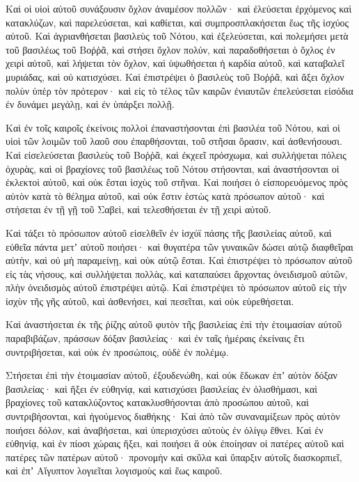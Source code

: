 {\par }{\PP {}Καὶ οἱ υἱοὶ αὐτοῦ συνάξουσιν ὄχλον ἀναμέσον πολλῶν· καὶ ἐλεύσεται ἐρχόμενος καὶ κατακλύζων, καὶ παρελεύσεται, καὶ καθίεται, καὶ συμπροσπλακήσεται ἕως τῆς ἰσχύος αὐτοῦ.
Καὶ ἀγριανθήσεται βασιλεὺς τοῦ Νότου, καὶ ἐξελεύσεται, καὶ πολεμήσει μετὰ τοῦ βασιλέως τοῦ Βοῤῥᾶ, καὶ στήσει ὄχλον πολύν, καὶ παραδοθήσεται ὁ ὄχλος ἐν χειρὶ αὐτοῦ,
καὶ λήψεται τὸν ὄχλον, καὶ ὑψωθήσεται ἡ καρδία αὐτοῦ, καὶ καταβαλεῖ μυριάδας, καὶ οὐ κατισχύσει.
Καὶ ἐπιστρέψει ὁ βασιλεὺς τοῦ Βοῤῥᾶ, καὶ ἄξει ὄχλον πολὺν ὑπὲρ τὸν πρότερον· καὶ εἰς τὸ τέλος τῶν καιρῶν ἐνιαυτῶν ἐπελεύσεται εἰσόδια ἐν δυνάμει μεγάλῃ, καὶ ἐν ὑπάρξει πολλῇ.
\par }{\PP {}Καὶ ἐν τοῖς καιροῖς ἐκείνοις πολλοὶ ἐπαναστήσονται ἐπὶ βασιλέα τοῦ Νότου, καὶ οἱ υἱοὶ τῶν λοιμῶν τοῦ λαοῦ σου ἐπαρθήσονται, τοῦ στῆσαι ὅρασιν, καὶ ἀσθενήσουσι.
Καὶ εἰσελεύσεται βασιλεὺς τοῦ Βοῤῥᾶ, καὶ ἐκχεεῖ πρόσχωμα, καὶ συλλήψεται πόλεις ὀχυρὰς, καὶ οἱ βραχίονες τοῦ βασιλέως τοῦ Νότου στήσονται, καὶ ἀναστήσονται οἱ ἐκλεκτοὶ αὐτοῦ, καὶ οὐκ ἔσται ἰσχὺς τοῦ στῆναι.
Καὶ ποιήσει ὁ εἰσπορευόμενος πρὸς αὐτὸν κατὰ τὸ θέλημα αὐτοῦ, καὶ οὐκ ἔστιν ἑστὼς κατὰ πρόσωπον αὐτοῦ· καὶ στήσεται ἐν τῇ γῇ τοῦ Σαβεὶ, καὶ τελεσθήσεται ἐν τῇ χειρὶ αὐτοῦ.
\par }{\PP {}Καὶ τάξει τὸ πρόσωπον αὐτοῦ εἰσελθεῖν ἐν ἰσχύϊ πάσης τῆς βασιλείας αὐτοῦ, καὶ εὐθεῖα πάντα μετʼ αὐτοῦ ποιήσει· καὶ θυγατέρα τῶν γυναικῶν δώσει αὐτῷ διαφθεῖραι αὐτὴν, καὶ οὐ μὴ παραμείνῃ, καὶ οὐκ αὐτῷ ἔσται.
Καὶ ἐπιστρέψει τὸ πρόσωπον αὐτοῦ εἰς τὰς νήσους, καὶ συλλήψεται πολλὰς, καὶ καταπαύσει ἄρχοντας ὀνειδισμοῦ αὐτῶν, πλὴν ὀνειδισμὸς αὐτοῦ ἐπιστρέψει αὐτῷ.
Καὶ ἐπιστρέψει τὸ πρόσωπον αὐτοῦ εἰς τὴν ἰσχὺν τῆς γῆς αὐτοῦ, καὶ ἀσθενήσει, καὶ πεσεῖται, καὶ οὐκ εὑρεθήσεται.
\par }{\PP {}Καὶ ἀναστήσεται ἐκ τῆς ῥίζης αὐτοῦ φυτὸν τῆς βασιλείας ἐπὶ τὴν ἑτοιμασίαν αὐτοῦ παραβιβάζων, πράσσων δόξαν βασιλείας· καὶ ἐν ταῖς ἡμέραις ἐκείναις ἔτι συντριβήσεται, καὶ οὐκ ἐν προσώποις, οὐδὲ ἐν πολέμῳ.
\par }{\PP {}Στήσεται ἐπὶ τὴν ἑτοιμασίαν αὐτοῦ, ἐξουδενώθη, καὶ οὐκ ἔδωκαν ἐπʼ αὐτὸν δόξαν βασιλείας· καὶ ἥξει ἐν εὐθηνίᾳ, καὶ κατισχύσει βασιλείας ἐν ὀλισθήμασι,
καὶ βραχίονες τοῦ κατακλύζοντος κατακλυσθήσονται ἀπὸ προσώπου αὐτοῦ, καὶ συντριβήσονται, καὶ ἡγούμενος διαθήκης·
Καὶ ἀπὸ τῶν συναναμίξεων πρὸς αὐτὸν ποιήσει δόλον, καὶ ἀναβήσεται, καὶ ὑπερισχύσει αὐτοὺς ἐν ὀλίγῳ ἔθνει.
Καὶ ἐν εὐθηνίᾳ, καὶ ἐν πίοσι χώραις ἥξει, καὶ ποιήσει ἃ οὐκ ἐποίησαν οἱ πατέρες αὐτοῦ καὶ πατέρες τῶν πατέρων αὐτοῦ· προνομὴν καὶ σκῦλα καὶ ὕπαρξιν αὐτοῖς διασκορπιεῖ, καὶ ἐπʼ Αἴγυπτον λογιεῖται λογισμοὺς καὶ ἕως καιροῦ.
}
